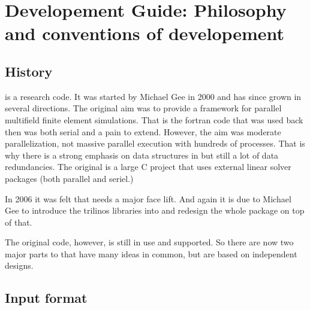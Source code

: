 
\makeatletter
\newenvironment{lyxcode}
{\begin{list}{}{
\setlength{\rightmargin}{\leftmargin}
\setlength{\listparindent}{0pt}%
\raggedright
\setlength{\itemsep}{0pt}
\setlength{\parsep}{0pt}
\normalfont\ttfamily}%
 \item[]}
{\end{list}}
\newenvironment{lyxlist}[1]
{\begin{list}{}
{\settowidth{\labelwidth}{#1}
 \setlength{\leftmargin}{\labelwidth}
 \addtolength{\leftmargin}{\labelsep}
 \renewcommand{\makelabel}[1]{##1\hfil}}}
{\end{list}}

\makeatother

\chapter{Developement Guide: Philosophy and conventions of \ccarat{} developement}

\section{History}

\ccarat{} is a research code. It was started by Michael Gee in 2000
and has since grown in several directions. The original aim was to
provide a framework for parallel multifield finite element simulations.
That is the fortran code that was used back then was both serial and
a pain to extend. However, the aim was moderate parallelization, not
massive parallel execution with hundreds of processes. That is why
there is a strong emphasis on data structures in \ccarat{} but still
a lot of data redundancies. The original \ccarat{} is a large C project
that uses external linear solver packages (both parallel and seriel.)

In 2006 it was felt that \ccarat{} needs a major face lift. And again
it is due to Michael Gee to introduce the trilinos libraries into
\ccarat{} and redesign the whole package on top of that.

The original code, however, is still in use and supported. So there
are now two major parts to \ccarat{} that have many ideas in common,
but are based on independent designs.

\section{Input format}

